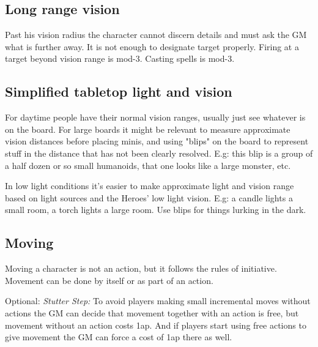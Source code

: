 \subsection*{Long range vision}
Past his vision radius the character cannot discern details and must ask the GM what is further away. It is not enough to designate target properly. Firing at a target beyond vision range is mod-3. Casting spells is mod-3.


\subsection*{Simplified tabletop light and vision}
For daytime people have their normal vision ranges, usually just see whatever is on the board. For large boards it might be relevant to measure approximate vision distances before placing minis, and using "blips" on the board to represent stuff in the distance that has not been clearly resolved. E.g: this blip is a group of a half dozen or so small humanoids, that one looks like a large monster, etc.

In low light conditions it's easier to make approximate light and vision range based on light sources and the Heroes' low light vision. E.g: a candle lights a small room, a torch lights a large room. Use blips for things lurking in the dark.






















\subsection*{Moving}
Moving a character is not an action, but it follows the rules of initiative. Movement can be done by itself or as part of an action.

Optional: \emph{Stutter Step:} To avoid players making small incremental moves without actions the GM can decide that movement together with an action is free, but movement without an action costs 1ap. And if players start using free actions to give movement the GM can force a cost of 1ap there as well.


